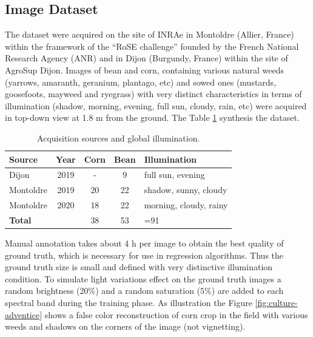 \documentclass[../thesis.tex]{subfiles}
\begin{document}
	\subsection{Image Dataset}
	
	The dataset were acquired on the site of INRAe in Montoldre (Allier, France) within the framework of the “RoSE challenge” founded by the French National Research Agency (ANR) and in Dijon (Burgundy, France) within the site of AgroSup Dijon. Images of bean and corn, containing various natural weeds (yarrows, amaranth, geranium, plantago, etc) and sowed ones (mustards, goosefoots, mayweed and ryegrass) with very distinct characteristics in terms of illumination (shadow, morning, evening, full sun, cloudy, rain, etc) were acquired in top-down view at 1.8 m from the ground. The Table \ref{tab:acquisition-source} synthesis the dataset.
	
	\begin{table}[H]
		\centering
		\begin{tabular}{|l|c|c|c|l|}
			\hline \textbf{Source}    & \textbf{Year} & \textbf{Corn} & \textbf{Bean} & \textbf{Illumination} \\ 
			\hline Dijon     & 2019 &  - & 9  & full sun, evening \\
			\hline Montoldre & 2019 & 20 & 22 & shadow, sunny, cloudy\\
			\hline Montoldre & 2020 & 18 & 22 & morning, cloudy, rainy\\ \hline
			\textbf{Total} & & 38 & 53 & =91 \\ 
			\hline
		\end{tabular}
		\caption{Acquisition sources and global illumination.}
		\label{tab:acquisition-source}
	\end{table}
	
	
	Manual annotation takes about 4 h per image to obtain the best quality of ground truth, which is necessary for use in regression algorithms. Thus the ground truth size is small and defined with very distinctive illumination condition. To simulate light variations effect on the  ground truth images a random brightness ($20\%$) and a random saturation ($5\%$) are added to each spectral band during the training phase. As illustration the Figure \ref{fig:culture-adventice} shows a false color reconstruction of corn crop in the field with various weeds and shadows on the corners of the image (not vignetting).
	
\end{document}
